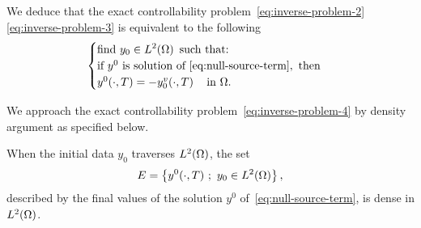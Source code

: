 \begin{remarque}
    We deduce that the exact controllability
    problem~\eqref{eq:inverse-problem-2}\eqref{eq:inverse-problem-3} is
    equivalent to the following
    \begin{equation}\label{eq:inverse-problem-4}
        \begin{cases}\displaystyle
            \text{find}\ y_{0}\in L^{2}\!\left({\Omega}\right)\ \text{such that:}\\
            \text{if}\ y^{0}\ \text{is solution
            of}~\eqref{eq:null-source-term},\ \text{then}\\
            y^{0}\!\left({\cdot,T}\right) = -y_{0}^{v}\!\left({\cdot,
            T}\right)\quad \text{in}\ \Omega.
        \end{cases}
    \end{equation}
\end{remarque}


We approach the exact controllability problem~\eqref{eq:inverse-problem-4}
by density argument as specified below.

\begin{proposition}\label{propo:controllability-result-1}%
    When the initial data $y_{0}$ traverses $L^{2}\!\left({\Omega}\right)$, the set
    \begin{equation*}\label{eq:controllability-result-1}
        E = \left\{{%
            y^{0}\!\left({\cdot,T}\right)\,;\ y_{0}\in\Ldeux{\Omega}
        }\right\},
    \end{equation*}
    described by the final values of the solution $y^{0}$
    of~\eqref{eq:null-source-term}, is dense in $L^{2}\!\left({\Omega}\right)$.
\end{proposition}

